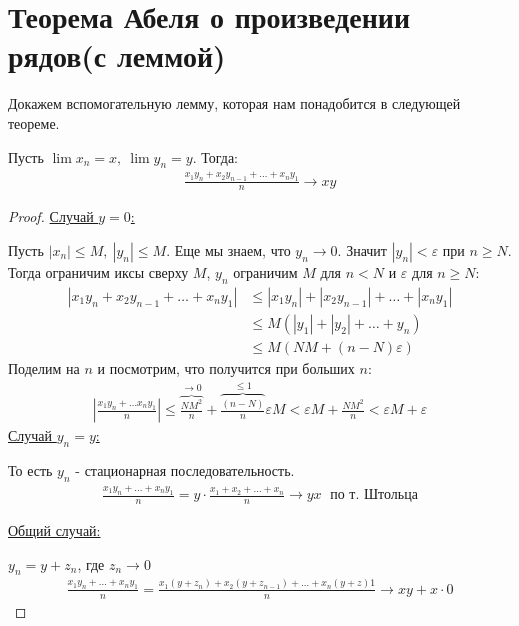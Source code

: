 \section{Теорема Абеля о произведении рядов(с леммой)}
Докажем вспомогательную лемму, которая нам понадобится в следующей теореме.
\begin{lemma}
    Пусть $\lim x_n = x,\ \lim y_n = y$. Тогда:
    \begin{gather*}
        \frac{x_1 y_n + x_2y_{n-1} + \ldots + x_ny_1}{n} \to xy
    \end{gather*}
\end{lemma}
\begin{proof} \quad 

    \underline{Случай $y = 0$:}

    Пусть $|x_n| \leq M,\ |y_n| \leq M$. Еще мы знаем, что $y_n \to 0$. Значит $|y_n| < \varepsilon$ при $n \geq N$.
    Тогда ограничим иксы сверху $M$, $y_n$ ограничим $M$ для $n < N$ и $\varepsilon$ для $n \geqslant N$:
    \begin{align*}
        |x_1y_n + x_2y_{n-1} + \ldots + x_ny_1| &\leqslant |x_1y_n| + |x_2y_{n-1}| + \ldots + |x_ny_1| \\
        &\leqslant M(|y_1|+|y_2|+\ldots + y_n) \\
        &\leqslant M(NM + (n-N)\varepsilon)
    \end{align*}
    Поделим на $n$ и посмотрим, что получится при больших $n$:
    \begin{gather*}
        \left|\frac{x_1y_n+\ldots x_ny_1}{n}\right|
        \leqslant \overbrace{\frac{NM^2}{n}}^{\to 0} +  \overbrace{\frac{(n-N)}{n}}^{\leq 1}\varepsilon M 
        < \varepsilon M + \frac{NM^2}{n}
        < \varepsilon M + \varepsilon
    \end{gather*}
    \underline{Случай $y_n = y$:} 
    
    То есть $y_n$ - стационарная последовательность.
    \begin{gather*}
        \frac{x_1y_n + \ldots + x_ny_1}{n} = y \cdot \frac{x_1+x_2+\ldots+x_n}{n} \longrightarrow yx \; \text{ по т. Штольца}
    \end{gather*}

    \underline{Общий случай:} 
    
    $y_n = y+z_n$, где $z_n \longrightarrow 0$
    \begin{gather*}
        \frac{x_1y_n + \ldots + x_ny_1}{n} = \frac{x_1(y+z_n) + x_2(y+z_{n-1}) + \ldots + x_n(y+z)1}{n} \longrightarrow xy + x\cdot 0 
    \end{gather*}
\end{proof}
